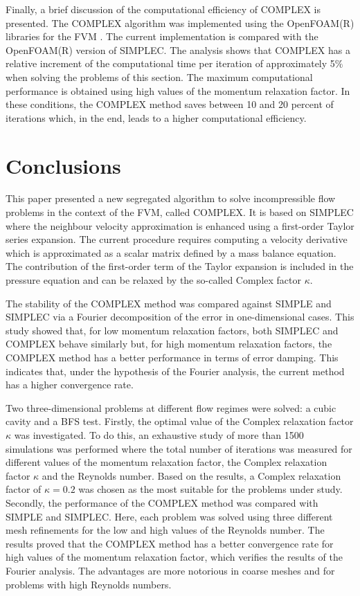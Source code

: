 \documentclass[final,3p,times,11pt,onecolumn]{myElsarticle}
\numberwithin{equation}{section}
\begin{document}
Finally, a brief discussion of the computational efficiency of COMPLEX is presented. The COMPLEX algorithm was implemented using the OpenFOAM(R) libraries for the FVM \cite{ofpg}. The current implementation is compared with the OpenFOAM(R) version of SIMPLEC. The analysis shows that COMPLEX has a relative increment of the computational time per iteration of approximately 5$\%$ when solving the problems of this section. The maximum computational performance is obtained using high values of the momentum relaxation factor. In these conditions, the COMPLEX method saves between 10 and 20 percent of iterations which, in the end, leads to a higher computational efficiency.

\section{Conclusions}
\label{sec:conclusions}
This paper presented a new segregated algorithm to solve incompressible flow problems in the context of the FVM, called COMPLEX. It is based on SIMPLEC where the neighbour velocity approximation is enhanced using a first-order Taylor series expansion. The current procedure requires computing a velocity derivative which is approximated as a scalar matrix defined by a mass balance equation. The contribution of the first-order term of the Taylor expansion is included in the pressure equation and can be relaxed by the so-called Complex factor $\kappa$.

The stability of the COMPLEX method was compared against SIMPLE and SIMPLEC via a Fourier decomposition of the error in one-dimensional cases. This study showed that, for low momentum relaxation factors, both SIMPLEC and COMPLEX behave similarly but, for high momentum relaxation factors, the COMPLEX method has a better performance in terms of error damping. This indicates that, under the hypothesis of the Fourier analysis, the current method has a higher convergence rate.

Two three-dimensional problems at different flow regimes were solved: a cubic cavity and a BFS test. Firstly, the optimal value of the Complex relaxation factor $\kappa$ was investigated. To do this, an exhaustive study of more than 1500 simulations was performed where the total number of iterations was measured for different values of the momentum relaxation factor, the Complex relaxation factor $\kappa$ and the Reynolds number. Based on the results, a Complex relaxation factor of $\kappa = 0.2$ was chosen as the most suitable for the problems under study. Secondly, the performance of the COMPLEX method was compared with SIMPLE and SIMPLEC. Here, each problem was solved using three different mesh refinements for the low and high values of the Reynolds number. The results proved that the COMPLEX method has a better convergence rate for high values of the momentum relaxation factor, which verifies the results of the Fourier analysis. The advantages are more notorious in coarse meshes and for problems with high Reynolds numbers. %
\end{document}
